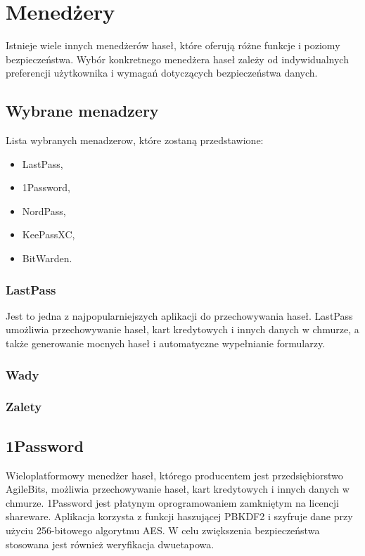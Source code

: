 \section{Menedżery}
Istnieje wiele innych menedżerów haseł, które oferują różne funkcje i poziomy bezpieczeństwa. Wybór konkretnego menedżera haseł zależy od indywidualnych preferencji użytkownika i wymagań dotyczących bezpieczeństwa danych.

\subsection{Wybrane menadzery}
Lista wybranych menadzerow, które zostaną przedstawione:
\begin{itemize}
    \item LastPass,
    \item 1Password,
    \item NordPass,
    \item KeePassXC,
    \item BitWarden.
\end{itemize}

\subsubsection{LastPass}

Jest to jedna z najpopularniejszych aplikacji do przechowywania haseł. LastPass umożliwia przechowywanie haseł, kart kredytowych i innych danych w chmurze, a także generowanie mocnych haseł i automatyczne wypełnianie formularzy.
\subsubsection{Wady}

\subsubsection{Zalety}

\subsection{1Password}
Wieloplatformowy menedżer haseł, którego producentem jest przedsiębiorstwo AgileBits, możliwia przechowywanie haseł, kart kredytowych i innych danych w chmurze. 1Password jest płatynym oprogramowaniem zamkniętym na licencji shareware. Aplikacja korzysta z funkcji haszującej PBKDF2 i szyfruje dane przy użyciu 256-bitowego algorytmu AES. W celu zwiększenia bezpieczeństwa stosowana jest również weryfikacja dwuetapowa.
